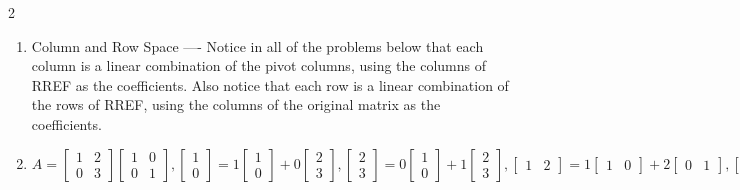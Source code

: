 \documentclass[10pt]{amsart}
\begin{document}
\begin{multicols}{2}
\begin{enumerate}
%
\item[VIII] Column and Row Space ---- Notice in all of the problems below that each column is a linear combination of the pivot columns, using the columns of RREF as the coefficients.  Also notice that each row is a linear combination of the rows of RREF, using the columns of the original matrix as the coefficients.
%
%
\item 
$A=\begin{bmatrix} 1&2\\0&3 \end{bmatrix}\begin{bmatrix} 1&0\\0&1 \end{bmatrix}, 
\begin{bmatrix} 1\\0 \end{bmatrix}=1\begin{bmatrix} 1\\0 \end{bmatrix}+0\begin{bmatrix} 2\\3 \end{bmatrix},
\begin{bmatrix} 2\\3 \end{bmatrix}=0\begin{bmatrix} 1\\0 \end{bmatrix}+1\begin{bmatrix} 2\\3 \end{bmatrix},
\begin{bmatrix} 1&2 \end{bmatrix}=1\begin{bmatrix} 1&0 \end{bmatrix}+2\begin{bmatrix} 0&1 \end{bmatrix},
\begin{bmatrix} 0&3 \end{bmatrix}=0\begin{bmatrix} 1&0 \end{bmatrix}+3\begin{bmatrix} 0&1 \end{bmatrix}.
$


\end{enumerate}
\end{multicols}
\end{document}

